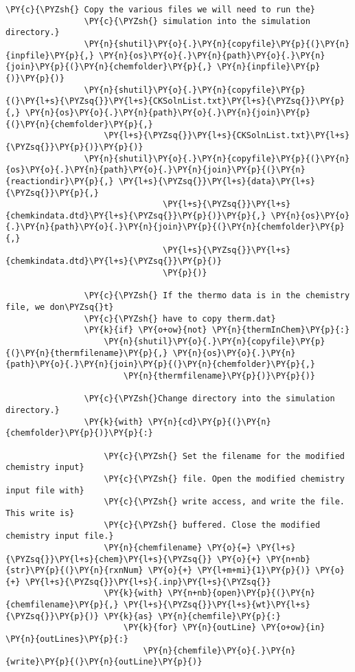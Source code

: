 \begin{Verbatim}[commandchars=\\\{\}]
                \PY{c}{\PYZsh{} Copy the various files we will need to run the}
                \PY{c}{\PYZsh{} simulation into the simulation directory.}
                \PY{n}{shutil}\PY{o}{.}\PY{n}{copyfile}\PY{p}{(}\PY{n}{inpfile}\PY{p}{,} \PY{n}{os}\PY{o}{.}\PY{n}{path}\PY{o}{.}\PY{n}{join}\PY{p}{(}\PY{n}{chemfolder}\PY{p}{,} \PY{n}{inpfile}\PY{p}{)}\PY{p}{)}
                \PY{n}{shutil}\PY{o}{.}\PY{n}{copyfile}\PY{p}{(}\PY{l+s}{\PYZsq{}}\PY{l+s}{CKSolnList.txt}\PY{l+s}{\PYZsq{}}\PY{p}{,} \PY{n}{os}\PY{o}{.}\PY{n}{path}\PY{o}{.}\PY{n}{join}\PY{p}{(}\PY{n}{chemfolder}\PY{p}{,}
                    \PY{l+s}{\PYZsq{}}\PY{l+s}{CKSolnList.txt}\PY{l+s}{\PYZsq{}}\PY{p}{)}\PY{p}{)}
                \PY{n}{shutil}\PY{o}{.}\PY{n}{copyfile}\PY{p}{(}\PY{n}{os}\PY{o}{.}\PY{n}{path}\PY{o}{.}\PY{n}{join}\PY{p}{(}\PY{n}{reactiondir}\PY{p}{,} \PY{l+s}{\PYZsq{}}\PY{l+s}{data}\PY{l+s}{\PYZsq{}}\PY{p}{,}
                                \PY{l+s}{\PYZsq{}}\PY{l+s}{chemkindata.dtd}\PY{l+s}{\PYZsq{}}\PY{p}{)}\PY{p}{,} \PY{n}{os}\PY{o}{.}\PY{n}{path}\PY{o}{.}\PY{n}{join}\PY{p}{(}\PY{n}{chemfolder}\PY{p}{,}
                                \PY{l+s}{\PYZsq{}}\PY{l+s}{chemkindata.dtd}\PY{l+s}{\PYZsq{}}\PY{p}{)}
                                \PY{p}{)}

                \PY{c}{\PYZsh{} If the thermo data is in the chemistry file, we don\PYZsq{}t}
                \PY{c}{\PYZsh{} have to copy therm.dat}
                \PY{k}{if} \PY{o+ow}{not} \PY{n}{thermInChem}\PY{p}{:}
                    \PY{n}{shutil}\PY{o}{.}\PY{n}{copyfile}\PY{p}{(}\PY{n}{thermfilename}\PY{p}{,} \PY{n}{os}\PY{o}{.}\PY{n}{path}\PY{o}{.}\PY{n}{join}\PY{p}{(}\PY{n}{chemfolder}\PY{p}{,}
                        \PY{n}{thermfilename}\PY{p}{)}\PY{p}{)}

                \PY{c}{\PYZsh{}Change directory into the simulation directory.}
                \PY{k}{with} \PY{n}{cd}\PY{p}{(}\PY{n}{chemfolder}\PY{p}{)}\PY{p}{:}

                    \PY{c}{\PYZsh{} Set the filename for the modified chemistry input}
                    \PY{c}{\PYZsh{} file. Open the modified chemistry input file with}
                    \PY{c}{\PYZsh{} write access, and write the file. This write is}
                    \PY{c}{\PYZsh{} buffered. Close the modified chemistry input file.}
                    \PY{n}{chemfilename} \PY{o}{=} \PY{l+s}{\PYZsq{}}\PY{l+s}{chem}\PY{l+s}{\PYZsq{}} \PY{o}{+} \PY{n+nb}{str}\PY{p}{(}\PY{n}{rxnNum} \PY{o}{+} \PY{l+m+mi}{1}\PY{p}{)} \PY{o}{+} \PY{l+s}{\PYZsq{}}\PY{l+s}{.inp}\PY{l+s}{\PYZsq{}}
                    \PY{k}{with} \PY{n+nb}{open}\PY{p}{(}\PY{n}{chemfilename}\PY{p}{,} \PY{l+s}{\PYZsq{}}\PY{l+s}{wt}\PY{l+s}{\PYZsq{}}\PY{p}{)} \PY{k}{as} \PY{n}{chemfile}\PY{p}{:}
                        \PY{k}{for} \PY{n}{outLine} \PY{o+ow}{in} \PY{n}{outLines}\PY{p}{:}
                            \PY{n}{chemfile}\PY{o}{.}\PY{n}{write}\PY{p}{(}\PY{n}{outLine}\PY{p}{)}


\end{Verbatim}
